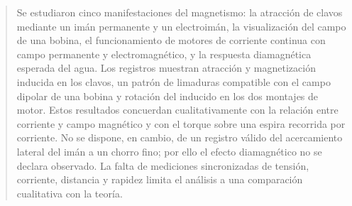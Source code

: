 \documentclass[10pt,letterpaper]{article}
\begin{document}
\begin{abstract}
Se estudiaron cinco manifestaciones del magnetismo: la atracción de clavos mediante un imán permanente y un electroimán, la visualización del campo de una bobina, el funcionamiento de motores de corriente continua con campo permanente y electromagnético, y la respuesta diamagnética esperada del agua. Los registros muestran atracción y magnetización inducida en los clavos, un patrón de limaduras compatible con el campo dipolar de una bobina y rotación del inducido en los dos montajes de motor. Estos resultados concuerdan cualitativamente con la relación entre corriente y campo magnético y con el torque sobre una espira recorrida por corriente. No se dispone, en cambio, de un registro válido del acercamiento lateral del imán a un chorro fino; por ello el efecto diamagnético no se declara observado. La falta de mediciones sincronizadas de tensión, corriente, distancia y rapidez limita el análisis a una comparación cualitativa con la teoría.
\end{abstract}
\end{document}
